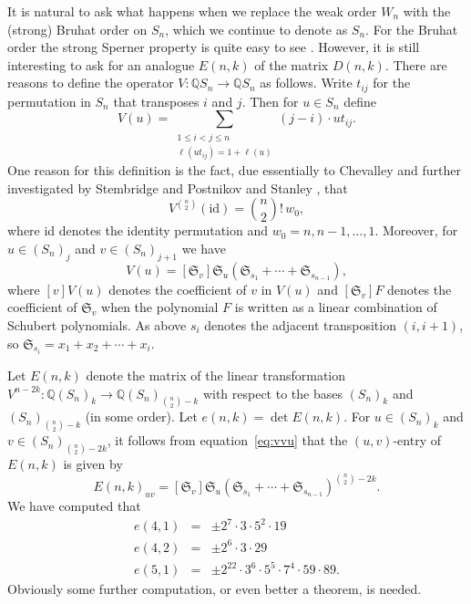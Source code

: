 \documentclass[12pt]{amsart}
\theoremstyle{definition}
\theoremstyle{remark}
\numberwithin{equation}{section}
\begin{document}
It is natural to ask what happens when we replace the weak order $W_n$
with the (strong) Bruhat order on $S_n$, which we continue to denote
as $S_n$. For the Bruhat order the strong Sperner property is quite easy to
see \cite[p.~182]{rs:hl}. However, it is still interesting to ask for
an analogue $E(n,k)$ of the matrix $D(n,k)$. There are reasons to
define the operator $V\colon {\mathbb{Q}} S_n\to {\mathbb{Q}} S_n$ as follows. Write
$t_{ij}$ for the permutation in $S_n$ that transposes $i$ and
$j$. Then for $u\in S_n$ define
  $$ V(u) = \sum_{\substack{1\leq i<j\leq n\\ \ell(ut_{ij})=1+\ell(u)}}
      (j-i)\cdot ut_{ij}. $$
One reason for this definition is the fact, due essentially to
Chevalley and further investigated by Stembridge \cite{stemb} and
Postnikov and Stanley \cite{p-s}, that
   $$ V^{\binom n2}(\mathrm{id}) = \binom n2!\,w_0, $$
where id denotes the identity permutation and $w_0=n,n-1,\dots,1$.
Moreover, for $u\in (S_n)_j$ and $v\in (S_n)_{j+1}$ we have
 \begin{equation} [v]V(u) = [{\mathfrak{S}}_v]{\mathfrak{S}}_u({\mathfrak{S}}_{s_1}+\cdots+{\mathfrak{S}}_{s_{n-1}}),
 \label{eq:vvu} \end{equation}
where $[v]V(u)$ denotes the coefficient of $v$ in $V(u)$ and
$[{\mathfrak{S}}_v]F$ denotes the coefficient of ${\mathfrak{S}}_v$ when the polynomial $F$
is written as a linear combination of Schubert polynomials. As above
$s_i$ denotes the adjacent transposition $(i,i+1)$, so
${\mathfrak{S}}_{s_i}=x_1+x_2+\cdots +x_i$.
   
Let $E(n,k)$ denote the matrix of the linear transformation
$V^{n-2k}\colon {\mathbb{Q}} (S_n)_k\to {\mathbb{Q}} (S_n)_{\binom n2-k}$ with respect
to the bases $(S_n)_k$ and $(S_n)_{\binom n2-k}$ (in some order). Let
$e(n,k) =\det E(n,k)$. For $u\in (S_n)_k$ and $v\in (S_n)_{\binom
  n2-2k}$, it follows from equation~\eqref{eq:vvu} that the
$(u,v)$-entry of $E(n,k)$ is given by 
  $$ E(n,k)_{uv} = [{\mathfrak{S}}_v]
     {\mathfrak{S}}_u({\mathfrak{S}}_{s_1}+\cdots+{\mathfrak{S}}_{s_{n-1}})^{\binom n2-2k}. $$
We have computed that
  \begin{eqnarray*} e(4,1) & = & \pm 2^7\cdot 3\cdot 5^2\cdot 19\\
        e(4,2) & = & \pm 2^6\cdot 3\cdot 29\\
        e(5,1) & = & \pm 2^{22}\cdot 3^6\cdot 5^5 \cdot 7^4
                     \cdot 59\cdot 89. \end{eqnarray*}
Obviously some further computation, or even better a theorem, is needed.
\end{document}
